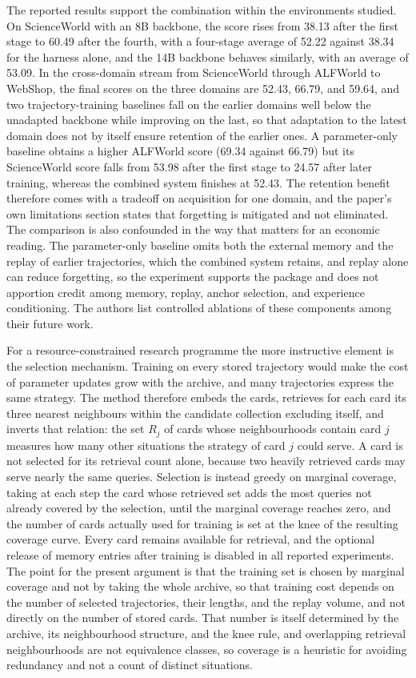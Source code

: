 \documentclass[11pt]{article}
\theoremstyle{remark}
\begin{document}
The reported results support the combination within the environments studied. On ScienceWorld with an 8B backbone, the score rises from 38.13 after the first stage to 60.49 after the fourth, with a four-stage average of 52.22 against 38.34 for the harness alone, and the 14B backbone behaves similarly, with an average of 53.09. In the cross-domain stream from ScienceWorld through ALFWorld to WebShop, the final scores on the three domains are 52.43, 66.79, and 59.64, and two trajectory-training baselines fall on the earlier domains well below the unadapted backbone while improving on the last, so that adaptation to the latest domain does not by itself ensure retention of the earlier ones. A parameter-only baseline obtains a higher ALFWorld score (69.34 against 66.79) but its ScienceWorld score falls from 53.98 after the first stage to 24.57 after later training, whereas the combined system finishes at 52.43. The retention benefit therefore comes with a tradeoff on acquisition for one domain, and the paper's own limitations section states that forgetting is mitigated and not eliminated. The comparison is also confounded in the way that matters for an economic reading. The parameter-only baseline omits both the external memory and the replay of earlier trajectories, which the combined system retains, and replay alone can reduce forgetting, so the experiment supports the package and does not apportion credit among memory, replay, anchor selection, and experience conditioning. The authors list controlled ablations of these components among their future work.

For a resource-constrained research programme the more instructive element is the selection mechanism. Training on every stored trajectory would make the cost of parameter updates grow with the archive, and many trajectories express the same strategy. The method therefore embeds the cards, retrieves for each card its three nearest neighbours within the candidate collection excluding itself, and inverts that relation: the set $R_j$ of cards whose neighbourhoods contain card $j$ measures how many other situations the strategy of card $j$ could serve. A card is not selected for its retrieval count alone, because two heavily retrieved cards may serve nearly the same queries. Selection is instead greedy on marginal coverage, taking at each step the card whose retrieved set adds the most queries not already covered by the selection, until the marginal coverage reaches zero, and the number of cards actually used for training is set at the knee of the resulting coverage curve. Every card remains available for retrieval, and the optional release of memory entries after training is disabled in all reported experiments. The point for the present argument is that the training set is chosen by marginal coverage and not by taking the whole archive, so that training cost depends on the number of selected trajectories, their lengths, and the replay volume, and not directly on the number of stored cards. That number is itself determined by the archive, its neighbourhood structure, and the knee rule, and overlapping retrieval neighbourhoods are not equivalence classes, so coverage is a heuristic for avoiding redundancy and not a count of distinct situations.
\end{document}
